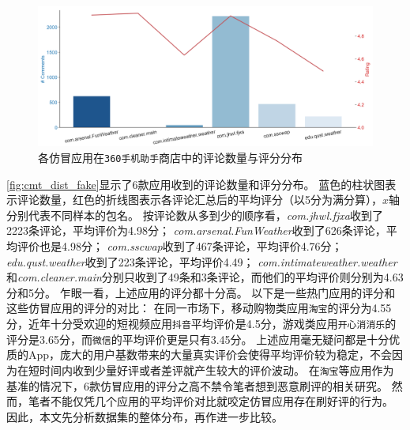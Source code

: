 %
%
%

\begin{figure}[htbp]
	\centering
	\includegraphics[width=\textwidth]{./Figures/edwin-cmt-ratings-dist-3.png}
    \caption{各仿冒应用在\texttt{360手机助手}商店中的评论数量与评分分布}
    \label{fig:cmt_dist_fake}
\end{figure}

\autoref{fig:cmt_dist_fake}显示了6款应用收到的评论数量和评分分布。
蓝色的柱状图表示评论数量，红色的折线图表示各评论汇总后的平均评分（以5分为满分算），$x$轴分别代表不同样本的包名。
按评论数从多到少的顺序看，\emph{com.jhwl.fjxa}收到了2223条评论，平均评价为4.98分；
\emph{com.arsenal.FunWeather}收到了626条评论，平均评价也是4.98分；
\emph{com.sscwap}收到了467条评论，平均评价4.76分；
\emph{edu.qust.weather}收到了223条评论，平均评价4.49；
\emph{com.intimateweather.weather}和\emph{com.cleaner.main}分别只收到了49条和3条评论，而他们的平均评价则分别为4.63分和5分。
乍眼一看，上述应用的评分都十分高。
以下是一些热门应用的评分和这些仿冒应用的评分的对比：
在同一市场下，移动购物类应用\texttt{淘宝}的评分为4.55分，近年十分受欢迎的短视频应用\texttt{抖音}平均评价是4.5分，游戏类应用\texttt{开心消消乐}的评分是3.65分，而\texttt{微信}的平均评价更是只有3.45分。
上述应用毫无疑问都是十分优质的App，庞大的用户基数带来的大量真实评价会使得平均评价较为稳定，不会因为在短时间内收到少量好评或者差评就产生较大的评价波动。
在\texttt{淘宝}等应用作为基准的情况下，6款仿冒应用的评分之高不禁令笔者想到恶意刷评的相关研究。
然而，笔者不能仅凭几个应用的平均评价对比就咬定仿冒应用存在刷好评的行为。
因此，本文先分析数据集的整体分布，再作进一步比较。

